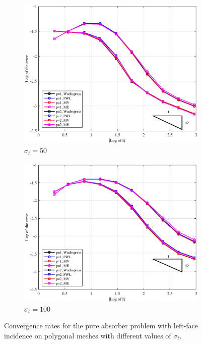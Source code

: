 \begin{figure}
{}
\vspace{1cm}
{
	\begin{subfigure}[b]{0.485\textwidth}
		\centering
		\label{subfig::PA_Left_Poly_sig50}
		\includegraphics[width=\textwidth]{figures/sec_BF/PAErr_Left_Poly_sig50.eps}
	\caption{$\sigma_t = 50$}
	\end{subfigure}
	\hfill
	\begin{subfigure}[b]{0.485\textwidth}
		\centering
		\label{subfig::PA_Left_Poly_sig100}
		\includegraphics[width=\textwidth]{figures/sec_BF/PAErr_Left_Poly_sig100.eps}
	\caption{$\sigma_t = 100$}
	\end{subfigure}
}
\caption{Convergence rates for the pure absorber problem with left-face incidence on polygonal meshes with different values of $\sigma_t$.}
\label{fig::BF_Results_PA_Left_Poly}
\end{figure}

